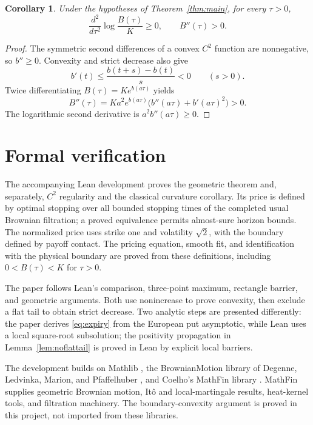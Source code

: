 \documentclass[11pt]{article}
\newtheorem{corollary}[theorem]{Corollary}
\begin{document}
\begin{corollary}
Under the hypotheses of Theorem~\ref{thm:main}, for every $\tau>0$,
\[
  \frac{d^2}{d\tau^2}\log\frac{B(\tau)}K\ge0,
  \qquad B''(\tau)>0.
\]
\end{corollary}

\begin{proof}
The symmetric second differences of a convex $C^2$ function are
nonnegative, so $b''\ge0$. Convexity and strict decrease also give
\[
  b'(t)\le\frac{b(t+s)-b(t)}s<0\qquad(s>0).
\]
Twice differentiating $B(\tau)=Ke^{b(a\tau)}$ yields
\[
  B''(\tau)=Ka^2e^{b(a\tau)}
       \bigl(b''(a\tau)+b'(a\tau)^2\bigr)>0.
\]
The logarithmic second derivative is $a^2b''(a\tau)\ge0$.
\end{proof}

\section{Formal verification}\label{sec:verification}

The accompanying Lean development \cite{Formalization} proves the
geometric theorem and, separately, $C^2$ regularity and the classical
curvature corollary. Its price is defined by optimal stopping over
all bounded stopping times of the completed usual Brownian filtration;
a proved equivalence permits almost-sure horizon bounds. The normalized
price uses strike one and volatility $\sqrt2$, with the boundary defined
by payoff contact. The pricing equation, smooth fit, and identification
with the physical boundary are proved from these definitions, including
$0<B(\tau)<K$ for $\tau>0$.

The paper follows Lean's comparison, three-point maximum, rectangle
barrier, and geometric arguments. Both use nonincrease to prove
convexity, then exclude a flat tail to obtain strict decrease.
Two analytic steps are presented differently: the paper derives
\eqref{eq:expiry} from the European put asymptotic, while Lean uses
a local square-root subsolution; the positivity propagation in
Lemma~\ref{lem:noflattail} is proved in Lean by explicit local barriers.

The development builds on Mathlib \cite{Mathlib2020}, the BrownianMotion library
of Degenne, Ledvinka, Marion, and Pfaffelhuber \cite{Degenne2025},
and Coelho's MathFin library \cite{Coelho2026}. MathFin supplies
geometric Brownian motion, It\^o and local-martingale results,
heat-kernel tools, and filtration machinery. The boundary-convexity
argument is proved in this project, not imported from these libraries.
\end{document}
